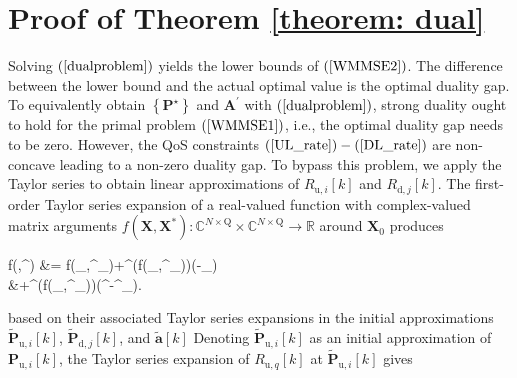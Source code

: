 \documentclass[10pt,journal]{IEEEtran}
\DeclareMathOperator{\vect}{vec}
\newcommand{\paren}[1]{\left({#1}\right)}
\newcommand{\bracket}[1]{{\left [{#1}\right ]}}
\newcommand{\braces}[1]{{\left\{ {#1}\right\}}}
\newcommand{\PiB}{\mathbf{P}_{\textrm{u},i}\bracket{k}}
\newcommand{\PBj}{\mathbf{P}_{\textrm{d},j}\bracket{k}}
\theoremstyle{definition}
\begin{document}
		\appendices
		\section{Proof of Theorem \ref{theorem: dual}}
		\label{appendix:theorem2}
		Solving $\paren{\ref{dualproblem}}$ yields the lower bounds of $\paren{\ref{WMMSE2}}$. The difference between the lower bound and the actual optimal value is the optimal duality gap. To equivalently obtain $\braces{\mathbf{P}^\star}$ and $\mathbf{A}^\prime$ with $\paren{\ref{dualproblem}}$, strong duality ought to hold for the primal problem $\paren{\ref{WMMSE1}}$, i.e., the optimal duality gap needs to be zero. However, the QoS constraints $\paren{\mathrm{\ref{UL_rate}}}-\paren{\mathrm{\ref{DL_rate}}}$ are non-concave leading to a non-zero duality gap. To bypass this problem, we apply the Taylor series to obtain linear approximations of $\mathit{R}_{\textrm{u},i}\bracket{k}$ and $\mathit{R}_{\textrm{d},j}\bracket{k}$. The first-order Taylor series expansion of a real-valued function with complex-valued matrix arguments $f\paren{\mathbf{X},\mathbf{X}^\ast}: \mathbb{C}^{\mathit{N}\times \mathrm{Q}}\times\mathbb{C}^{\mathit{N}\times \mathrm{Q}}\rightarrow\mathbb{R}$ around $\mathbf{X}_{\mathrm{0}}$ produces \cite{IMM2012-03274} \par\noindent\small
		\begin{flalign}
			\label{eq: Taylor}
			f\paren{,\mathbf{X}^\ast} &= f\paren{_{},\mathbf{X}^\ast_{}}+\vect^\top\paren{f\paren{\mathbf{X}_{\mathrm{0}},\mathbf{X}^\ast_{}}}\vect\paren{-\mathbf{X}_{}}\nonumber\\
			&+\vect^\top\paren{f\paren{\mathbf{X}_{\mathrm{0}},\mathbf{X}^\ast_{}}}\vect\paren{^\ast-\mathbf{X}^\ast_{\mathrm{0}}}.
		\end{flalign}\normalsize
		based on their associated Taylor series expansions in the initial approximations %
		$\widetilde{\mathbf{P}}_{\textrm{u},i}\bracket{k}$, $\widetilde{\mathbf{P}}_{\textrm{d},j}\bracket{k}$, and $\widetilde{\mathbf{a}}\bracket{k}$ Denoting $\widetilde{\mathbf{P}}_{\textrm{u},i}\bracket{k}$ as an initial approximation of $\PiB$, the Taylor series expansion of $\mathit{R}_{\textrm{u},q}\bracket{k}$ at $\widetilde{\mathbf{P}}_{\textrm{u},i}\bracket{k}$ gives \par\noindent\small
\end{document}
